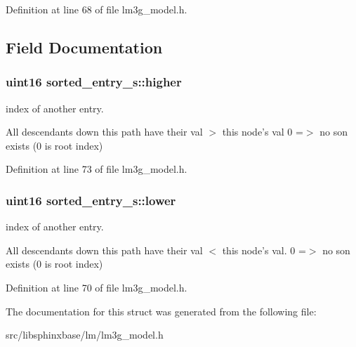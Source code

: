 Definition at line 68 of file lm3g\_\-model.h.

\subsection{Field Documentation}
\subsubsection[{higher}]{\setlength{\rightskip}{0pt plus 5cm}uint16 {\bf sorted\_\-entry\_\-s::higher}}\label{structsorted__entry__s_f3d7fdd1865a965689906a2b4c12c641}


index of another entry. 

All descendants down this path have their val $>$ this node's val 0 =$>$ no son exists (0 is root index) 

Definition at line 73 of file lm3g\_\-model.h.
\subsubsection[{lower}]{\setlength{\rightskip}{0pt plus 5cm}uint16 {\bf sorted\_\-entry\_\-s::lower}}\label{structsorted__entry__s_186102da5e815345b92b1cc8895e5eb5}


index of another entry. 

All descendants down this path have their val $<$ this node's val. 0 =$>$ no son exists (0 is root index) 

Definition at line 70 of file lm3g\_\-model.h.

The documentation for this struct was generated from the following file:\begin{CompactItemize}
\item 
src/libsphinxbase/lm/lm3g\_\-model.h\end{CompactItemize}
